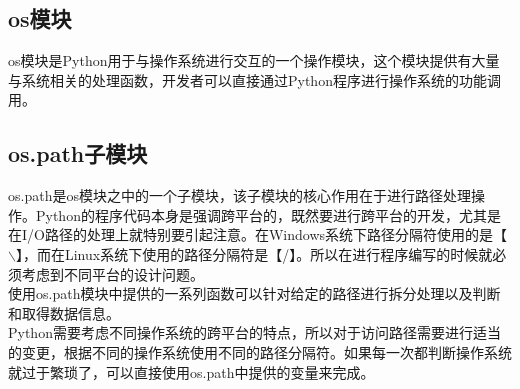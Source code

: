 \subsection{os模块}

os模块是Python用于与操作系统进行交互的一个操作模块，这个模块提供有大量与系统相关的处理函数，开发者可以直接通过Python程序进行操作系统的功能调用。

\begin{table}[H]
	\centering
	\caption{os模块}
\end{table}

\vspace{0.5cm}

\subsection{os.path子模块}

os.path是os模块之中的一个子模块，该子模块的核心作用在于进行路径处理操作。Python的程序代码本身是强调跨平台的，既然要进行跨平台的开发，尤其是在I/O路径的处理上就特别要引起注意。在Windows系统下路径分隔符使用的是【$ \backslash $】，而在Linux系统下使用的路径分隔符是【/】。所以在进行程序编写的时候就必须考虑到不同平台的设计问题。\\

使用os.path模块中提供的一系列函数可以针对给定的路径进行拆分处理以及判断和取得数据信息。\\

Python需要考虑不同操作系统的跨平台的特点，所以对于访问路径需要进行适当的变更，根据不同的操作系统使用不同的路径分隔符。如果每一次都判断操作系统就过于繁琐了，可以直接使用os.path中提供的变量来完成。

